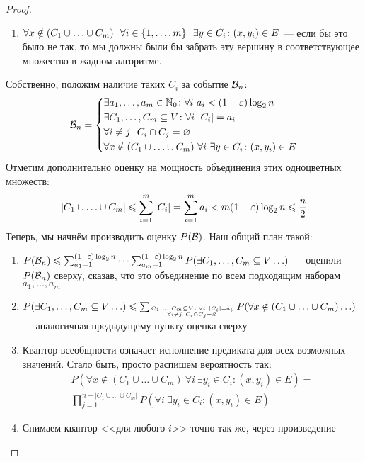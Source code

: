 \begin{proof}
\begin{enumerate}
		\item $\forall x \notin (C_1 \cup \ldots \cup C_m)\ \ \forall i \in \range{m}\ \ \exists y \in C_i \colon (x, y_i) \in E$ --- если бы это было не так, то мы должны были бы забрать эту вершину в соответствующее множество в жадном алгоритме.
	\end{enumerate}
	Собственно, положим наличие таких $C_i$ за событие $\cB_n$:
	\[
		\cB_n = \System{
			&{\exists a_1, \ldots, a_m \in \N_0 \colon \forall i\ a_i < (1 - \eps)\log_2 n}
			\\
			&{\exists C_1, \ldots, C_m \subseteq V \colon \forall i\ |C_i| = a_i}
			\\
			&{\forall i \neq j\ \ C_i \cap C_j = \emptyset}
			\\
			&{\forall x \notin (C_1 \cup \ldots \cup C_m)\ \forall i\ \exists y \in C_i \colon (x, y_i) \in E}
		}
	\]
	Отметим дополнительно оценку на мощность объединения этих одноцветных множеств:
	\[
		|C_1 \cup \ldots \cup C_m| \le \sum_{i = 1}^m |C_i| = \sum_{i = 1}^m a_i < m (1 - \eps)\log_2 n \le \frac{n}{2}
	\]
	Теперь, мы начнём производить оценку $P(\cB)$. Наш общий план такой:
	\begin{enumerate}
		\item $P(\cB_n) \le \sum_{a_1 = 1}^{(1 - \eps)\log_2 n} \cdots \sum_{a_m = 1}^{(1 - \eps)\log_2 n} P(\exists C_1, \ldots, C_m \subseteq V \ldots)$ --- оценили $P(\cB_n)$ сверху, сказав, что это объединение по всем подходящим наборам $a_1, \ldots, a_m$
		
		\item $P(\exists C_1, \ldots, C_m \subseteq V \ldots) \le \sum_{C_1, \ldots, C_m \subseteq V \colon \forall i\ |C_i| = a_i \atop {\forall i \neq j\ C_i \cap C_j = \emptyset}} P(\forall x \notin (C_1 \cup \ldots \cup C_m) \ldots)$ --- аналогичная предыдущему пункту оценка сверху
		
		\item Квантор всеобщности означает исполнение предиката для всех возможных значений. Стало быть, просто распишем вероятность так:
		\begin{multline*}
			P(\forall x \notin (C_1 \cup \ldots \cup C_m)\ \forall i\ \exists y_i \in C_i \colon (x, y_i) \in E) =
			\\
			\prod_{j = 1}^{n - |C_1 \cup \ldots \cup C_m|} P(\forall i\ \exists y_i \in C_i \colon (x, y_i) \in E)
		\end{multline*}
		
		\item Снимаем квантор <<для любого $i$>> точно так же, через произведение
		

\end{enumerate}
\end{proof}
